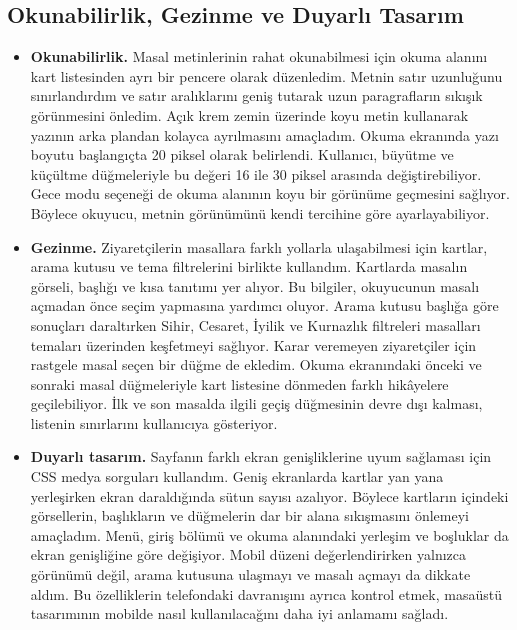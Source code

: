 \documentclass[12pt,a4paper]{article}
\begin{document}
\subsection{Okunabilirlik, Gezinme ve Duyarlı Tasarım}
\begin{itemize}

\item \textbf{Okunabilirlik.}
Masal metinlerinin rahat okunabilmesi için okuma alanını
kart listesinden ayrı bir pencere olarak düzenledim.
Metnin satır uzunluğunu sınırlandırdım ve satır aralıklarını
geniş tutarak uzun paragrafların sıkışık görünmesini önledim.
Açık krem zemin üzerinde koyu metin kullanarak yazının
arka plandan kolayca ayrılmasını amaçladım.
Okuma ekranında yazı boyutu başlangıçta 20 piksel olarak
belirlendi. Kullanıcı, büyütme ve küçültme düğmeleriyle
bu değeri 16 ile 30 piksel arasında değiştirebiliyor.
Gece modu seçeneği de okuma alanının koyu bir görünüme
geçmesini sağlıyor. Böylece okuyucu, metnin görünümünü
kendi tercihine göre ayarlayabiliyor.

\item \textbf{Gezinme.}
Ziyaretçilerin masallara farklı yollarla ulaşabilmesi için
kartlar, arama kutusu ve tema filtrelerini birlikte kullandım.
Kartlarda masalın görseli, başlığı ve kısa tanıtımı yer alıyor.
Bu bilgiler, okuyucunun masalı açmadan önce seçim yapmasına
yardımcı oluyor. Arama kutusu başlığa göre sonuçları
daraltırken Sihir, Cesaret, İyilik ve Kurnazlık filtreleri
masalları temaları üzerinden keşfetmeyi sağlıyor.
Karar veremeyen ziyaretçiler için rastgele masal seçen
bir düğme de ekledim. Okuma ekranındaki önceki ve sonraki
masal düğmeleriyle kart listesine dönmeden farklı
hikâyelere geçilebiliyor. İlk ve son masalda ilgili geçiş
düğmesinin devre dışı kalması, listenin sınırlarını
kullanıcıya gösteriyor.

\item \textbf{Duyarlı tasarım.}
Sayfanın farklı ekran genişliklerine uyum sağlaması için
CSS medya sorguları kullandım. Geniş ekranlarda kartlar
yan yana yerleşirken ekran daraldığında sütun sayısı
azalıyor. Böylece kartların içindeki görsellerin,
başlıkların ve düğmelerin dar bir alana sıkışmasını
önlemeyi amaçladım. Menü, giriş bölümü ve okuma alanındaki
yerleşim ve boşluklar da ekran genişliğine göre değişiyor.
Mobil düzeni değerlendirirken yalnızca görünümü değil,
arama kutusuna ulaşmayı ve masalı açmayı da dikkate aldım.
Bu özelliklerin telefondaki davranışını ayrıca kontrol
etmek, masaüstü tasarımının mobilde nasıl kullanılacağını
daha iyi anlamamı sağladı.


\end{itemize}
\end{document}

